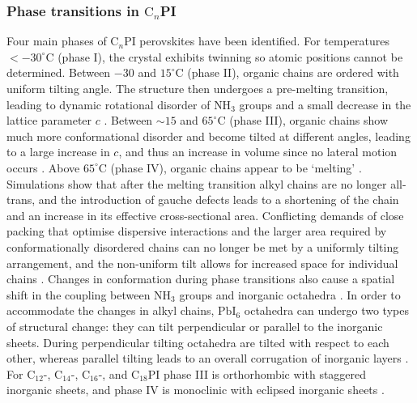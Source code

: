 \subsubsection{Phase transitions in $\textrm{C}_n$PI}
\label{sec:Cnphases}
Four main phases of $\textrm{C}_n$PI perovskites have been identified. For temperatures $< -30^{\circ}$C (phase I), the crystal exhibits twinning so atomic positions cannot be determined. Between $-30$ and $15^{\circ}$C  (phase II), organic chains are ordered with uniform tilting angle. The structure then undergoes a pre-melting transition, leading to dynamic rotational disorder of $\textrm{NH}_3$ groups and a small decrease in the lattice parameter $c$ \cite{Barman2003}. Between $\sim 15$ and $65^{\circ}$C (phase III), organic chains show much more conformational disorder and become tilted at different angles, leading to a large increase in $c$, and thus an increase in volume since no lateral motion occurs \cite{Barman2003}. Above $65^{\circ}$C (phase IV), organic chains appear to be `melting' \cite{Ishihara1990, Xu1991, Ishihara1989}. Simulations show that after the melting transition alkyl chains are no longer all-trans, and the introduction of gauche defects leads to a shortening of the chain and an increase in its effective cross-sectional area. Conflicting demands of close packing that optimise dispersive interactions and the larger area required by conformationally disordered chains can no longer be met by a uniformly tilting arrangement, and the non-uniform tilt allows for increased space for individual chains \cite{Naik2010}. Changes in conformation during phase transitions also cause a spatial shift in the coupling between $\textrm{NH}_3$ groups and inorganic octahedra \cite{Pradeesh2009}. In order to accommodate the changes in alkyl chains, $\textrm{PbI}_6$ octahedra can undergo two types of structural change: they can tilt perpendicular or parallel to the inorganic sheets. During perpendicular tilting octahedra are tilted with respect to each other, whereas parallel tilting leads to an overall corrugation of inorganic layers \cite{Billing2008}. For $\textrm{C}_{12}$-, $\textrm{C}_{14}$-, $\textrm{C}_{16}$-, and $\textrm{C}_{18}$PI phase III is orthorhombic with staggered inorganic sheets, and phase IV is monoclinic with eclipsed inorganic sheets \cite{Billing2008}.    

